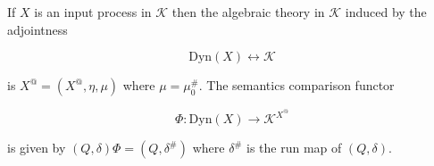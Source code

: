 If $X$ is an input process in $\mathcal{K}$ then the algebraic theory in $\mathcal{K}$ induced by the adjointness

$$\text{Dyn}(X) \longleftrightarrow \mathcal{K}$$

is $X^@ = (X^@, \eta, \mu)$ where $\mu = \mu_0^{\#}$. The semantics comparison functor

$$\Phi: \text{Dyn}(X) \longrightarrow \mathcal{K}^{X^@}$$

is given by $(Q, \delta)\Phi = (Q, \delta^{\#})$ where $\delta^{\#}$ is the run map of $(Q, \delta)$.
